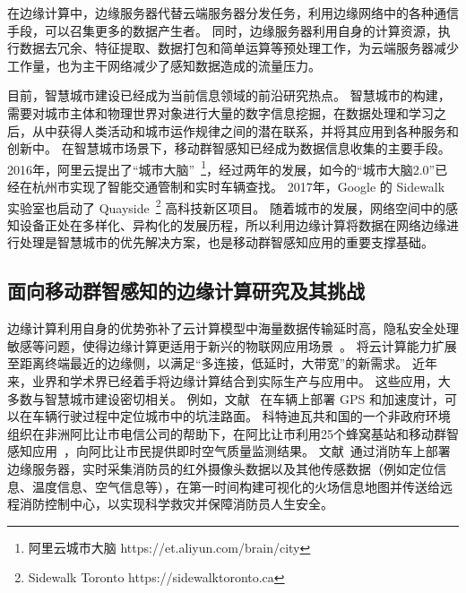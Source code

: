 在边缘计算中，边缘服务器代替云端服务器分发任务，利用边缘网络中的各种通信手段，可以召集更多的数据产生者。
同时，边缘服务器利用自身的计算资源，执行数据去冗余、特征提取、数据打包和简单运算等预处理工作，为云端服务器减少工作量，也为主干网络减少了感知数据造成的流量压力。


目前，智慧城市建设已经成为当前信息领域的前沿研究热点。
智慧城市的构建，需要对城市主体和物理世界对象进行大量的数字信息挖掘，在数据处理和学习之后，从中获得人类活动和城市运作规律之间的潜在联系，并将其应用到各种服务和创新中。
在智慧城市场景下，移动群智感知已经成为数据信息收集的主要手段。
2016年，阿里云提出了“城市大脑”~\footnote{阿里云城市大脑 https://et.aliyun.com/brain/city}，经过两年的发展，如今的“城市大脑2.0”已经在杭州市实现了智能交通管制和实时车辆查找。
2017年，Google 的 Sidewalk 实验室也启动了 Quayside~\footnote{Sidewalk Toronto https://sidewalktoronto.ca} 高科技新区项目。
随着城市的发展，网络空间中的感知设备正处在多样化、异构化的发展历程，所以利用边缘计算将数据在网络边缘进行处理是智慧城市的优先解决方案，也是移动群智感知应用的重要支撑基础。

\subsection{面向移动群智感知的边缘计算研究及其挑战}


边缘计算利用自身的优势弥补了云计算模型中海量数据传输延时高，隐私安全处理敏感等问题，使得边缘计算更适用于新兴的物联网应用场景~\cite{DBLP:journals/cm/SunA16}。
将云计算能力扩展至距离终端最近的边缘侧，以满足“多连接，低延时，大带宽”的新需求。
近年来，业界和学术界已经着手将边缘计算结合到实际生产与应用中。
这些应用，大多数与智慧城市建设密切相关。
例如，文献~\cite{DBLP:journals/cm/GantiYL11} 在车辆上部署 GPS 和加速度计，可以在车辆行驶过程中定位城市中的坑洼路面。
科特迪瓦共和国的一个非政府环境组织在非洲阿比让市电信公司的帮助下，在阿比让市利用25个蜂窝基站和移动群智感知应用~\cite{DBLP:conf/huc/ZhangXWC14}，向阿比让市民提供即时空气质量监测结果。
文献~\cite{DBLP:conf/hotweb/WuDZS17}通过消防车上部署边缘服务器，实时采集消防员的红外摄像头数据以及其他传感数据（例如定位信息、温度信息、空气信息等），在第一时间构建可视化的火场信息地图并传送给远程消防控制中心，以实现科学救灾并保障消防员人生安全。

